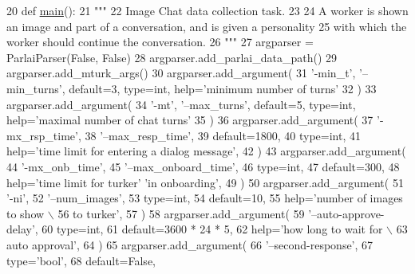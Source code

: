 \begin{DoxyCode}
20 \textcolor{keyword}{def }\hyperlink{namespaceprojects_1_1wizard__of__wikipedia_1_1mturk__evaluation__task_1_1run_ad3ab2c71f8083c3112815c0b363d316b}{main}():
21     \textcolor{stringliteral}{"""}
22 \textcolor{stringliteral}{    Image Chat data collection task.}
23 \textcolor{stringliteral}{}
24 \textcolor{stringliteral}{    A worker is shown an image and part of a conversation, and is given a personality}
25 \textcolor{stringliteral}{    with which the worker should continue the conversation.}
26 \textcolor{stringliteral}{    """}
27     argparser = ParlaiParser(\textcolor{keyword}{False}, \textcolor{keyword}{False})
28     argparser.add\_parlai\_data\_path()
29     argparser.add\_mturk\_args()
30     argparser.add\_argument(
31         \textcolor{stringliteral}{'-min\_t'}, \textcolor{stringliteral}{'--min\_turns'}, default=3, type=int, help=\textcolor{stringliteral}{'minimum number of turns'}
32     )
33     argparser.add\_argument(
34         \textcolor{stringliteral}{'-mt'}, \textcolor{stringliteral}{'--max\_turns'}, default=5, type=int, help=\textcolor{stringliteral}{'maximal number of chat turns'}
35     )
36     argparser.add\_argument(
37         \textcolor{stringliteral}{'-mx\_rsp\_time'},
38         \textcolor{stringliteral}{'--max\_resp\_time'},
39         default=1800,
40         type=int,
41         help=\textcolor{stringliteral}{'time limit for entering a dialog message'},
42     )
43     argparser.add\_argument(
44         \textcolor{stringliteral}{'-mx\_onb\_time'},
45         \textcolor{stringliteral}{'--max\_onboard\_time'},
46         type=int,
47         default=300,
48         help=\textcolor{stringliteral}{'time limit for turker'} \textcolor{stringliteral}{'in onboarding'},
49     )
50     argparser.add\_argument(
51         \textcolor{stringliteral}{'-ni'},
52         \textcolor{stringliteral}{'--num\_images'},
53         type=int,
54         default=10,
55         help=\textcolor{stringliteral}{'number of images to show \(\backslash\)}
56 \textcolor{stringliteral}{                           to turker'},
57     )
58     argparser.add\_argument(
59         \textcolor{stringliteral}{'--auto-approve-delay'},
60         type=int,
61         default=3600 * 24 * 5,
62         help=\textcolor{stringliteral}{'how long to wait for  \(\backslash\)}
63 \textcolor{stringliteral}{                           auto approval'},
64     )
65     argparser.add\_argument(
66         \textcolor{stringliteral}{'--second-response'},
67         type=\textcolor{stringliteral}{'bool'},
68         default=\textcolor{keyword}{False},

\end{DoxyCode}
